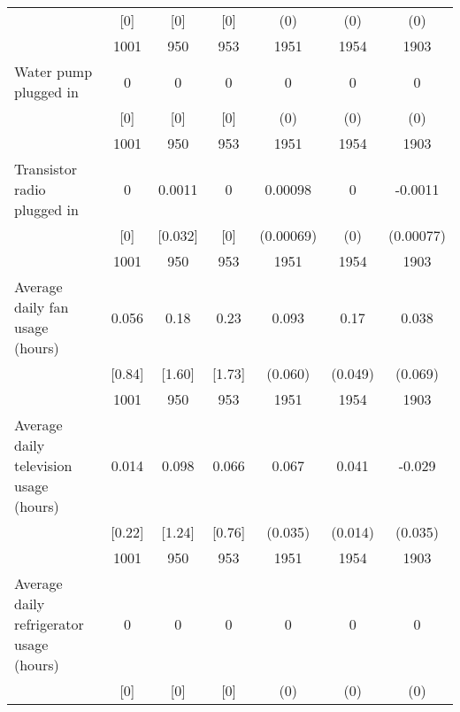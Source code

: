 \begin{table}[htbp]
\begin{tabular*}{1\hsize}{@{\hskip\tabcolsep\extracolsep\fill}l*{1}{cccccc}}
                                &      [0]&      [0]&      [0]&      (0)         &      (0)         &      (0)         \\
                                &     1001&      950&      953&     1951         &     1954         &     1903         \\
Water pump plugged in           &        0&        0&        0&        0         &        0         &        0         \\
                                &      [0]&      [0]&      [0]&      (0)         &      (0)         &      (0)         \\
                                &     1001&      950&      953&     1951         &     1954         &     1903         \\
Transistor radio plugged in     &        0&   0.0011&        0&  0.00098         &        0         &  -0.0011         \\
                                &      [0]&  [0.032]&      [0]&(0.00069)         &      (0)         &(0.00077)         \\
                                &     1001&      950&      953&     1951         &     1954         &     1903         \\
Average daily fan usage (hours) &    0.056&     0.18&     0.23&    0.093         &     0.17\sym{***}&    0.038         \\
                                &   [0.84]&   [1.60]&   [1.73]&  (0.060)         &  (0.049)         &  (0.069)         \\
                                &     1001&      950&      953&     1951         &     1954         &     1903         \\
Average daily television usage (hours)&    0.014&    0.098&    0.066&    0.067\sym{*}  &    0.041\sym{***}&   -0.029         \\
                                &   [0.22]&   [1.24]&   [0.76]&  (0.035)         &  (0.014)         &  (0.035)         \\
                                &     1001&      950&      953&     1951         &     1954         &     1903         \\
Average daily refrigerator usage (hours)&        0&        0&        0&        0         &        0         &        0         \\
                                &      [0]&      [0]&      [0]&      (0)         &      (0)         &      (0)         \\

\end{tabular*}
\end{table}
